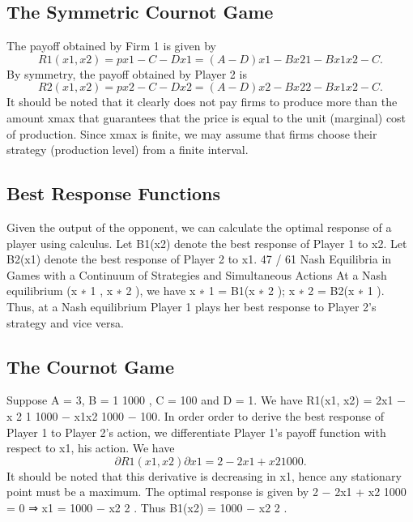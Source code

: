 \documentclass[]{report}
\begin{document}
\subsection{The Symmetric Cournot Game}
The payoff obtained by Firm 1 is given by
\[R1(x1, x2) = px1 − C − Dx1 = (A − D)x1 − Bx2
1 − Bx1x2 − C.\]
By symmetry, the payoff obtained by Player 2 is
\[R2(x1, x2) = px2 − C − Dx2 = (A − D)x2 − Bx2
2 − Bx1x2 − C.\]
It should be noted that it clearly does not pay firms to produce
more than the amount xmax that guarantees that the price is equal
to the unit (marginal) cost of production. Since xmax is finite, we
may assume that firms choose their strategy (production level)
from a finite interval.
\subsection{Best Response Functions}
Given the output of the opponent, we can calculate the optimal
response of a player using calculus.
Let B1(x2) denote the best response of Player 1 to x2.
Let B2(x1) denote the best response of Player 2 to x1.
47 / 61
Nash Equilibria in Games with a Continuum of Strategies
and Simultaneous Actions
At a Nash equilibrium (x
∗
1
, x
∗
2
), we have
x
∗
1 = B1(x
∗
2
); x
∗
2 = B2(x
∗
1
).
Thus, at a Nash equilibrium Player 1 plays her best response to
Player 2’s strategy and vice versa.
\subsection{The Cournot Game}
Suppose A = 3, B =
1
1000 , C = 100 and D = 1.
We have
R1(x1, x2) = 2x1 −
x
2
1
1000
−
x1x2
1000
− 100.
In order order to derive the best response of Player 1 to Player 2’s
action, we differentiate Player 1’s payoff function with respect to
x1, his action.
We have
\[∂R1(x1, x2)
∂x1
= 2 −
2x1 + x2
1000
.\]
It should be noted that this derivative is decreasing in x1, hence
any stationary point must be a maximum.
The optimal response is given by
2 −
2x1 + x2
1000
= 0 ⇒ x1 = 1000 −
x2
2
.
Thus B1(x2) = 1000 −
x2
2
.
\end{document}
